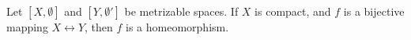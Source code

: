 Let $[X, \emptyset]$ and $[Y, \emptyset']$ be metrizable spaces. If $X$ is compact, and $f$ is a bijective mapping $X \leftrightarrow Y$, then $f$ is a homeomorphism.
